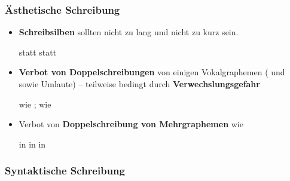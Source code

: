 \begin{frame}
\frametitle{Ästhetische Schreibung}

\begin{itemize}
	\item \textbf{Schreibsilben} sollten nicht zu lang und nicht zu kurz sein.
	
	\eal
	\ex {} statt 
	\ex {} statt 
	\zl

\pause 
	
	\item \textbf{Verbot von Doppelschreibungen} von einigen Vokalgraphemen ( und  sowie Umlaute) -- teilweise bedingt durch \textbf{Verwechslungsgefahr}
	
	\ea
	 wie ;  wie 
	\z
	
\pause 
		
	\item Verbot von \textbf{Doppelschreibung von Mehrgraphemen} wie
	
	\eal
		\ex {} in 
		\ex {} in  
		\ex {} in 
	\zl
	
\end{itemize}

\end{frame}


\subsubsection{Syntaktische Schreibung}

